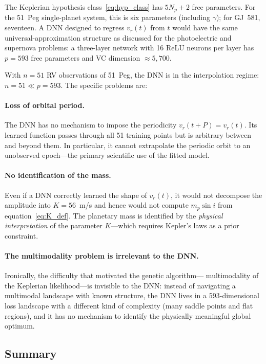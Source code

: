 \documentclass[12pt]{article}
\begin{document}
The Keplerian hypothesis class~\eqref{eq:hyp_class} has $5N_p + 2$
free parameters.  For the 51~Peg single-planet system, this is
six parameters (including $\gamma$); for GJ~581, seventeen.
A DNN designed to regress $v_r(t)$ from $t$ would have the same
universal-approximation structure as discussed for the photoelectric
and supernova problems: a three-layer network with 16 ReLU neurons per
layer has $p = 593$ free parameters and VC dimension $\approx 5{,}700$.

With $n = 51$ RV observations of 51~Peg, the DNN is in the interpolation
regime: $n = 51 \ll p = 593$.  The specific problems are:

\paragraph{Loss of orbital period.}
The DNN has no mechanism to impose the periodicity
$v_r(t + P) = v_r(t)$.  Its learned function passes through all 51
training points but is arbitrary between and beyond them.  In particular,
it cannot extrapolate the periodic orbit to an unobserved epoch---the
primary scientific use of the fitted model.

\paragraph{No identification of the mass.}
Even if a DNN correctly learned the shape of $v_r(t)$, it would not
decompose the amplitude into $K = 56$~m/s and hence would not compute
$m_p\sin i$ from equation~\eqref{eq:K_def}.  The planetary mass
is identified by the \emph{physical interpretation} of the parameter
$K$---which requires Kepler's laws as a prior constraint.

\paragraph{The multimodality problem is irrelevant to the DNN.}
Ironically, the difficulty that motivated the genetic algorithm---
multimodality of the Keplerian likelihood---is invisible to the DNN:
instead of navigating a multimodal landscape with known structure, the
DNN lives in a 593-dimensional loss landscape with a different kind of
complexity (many saddle points and flat regions), and it has no mechanism
to identify the physically meaningful global optimum.

\subsection{Summary}
\end{document}

